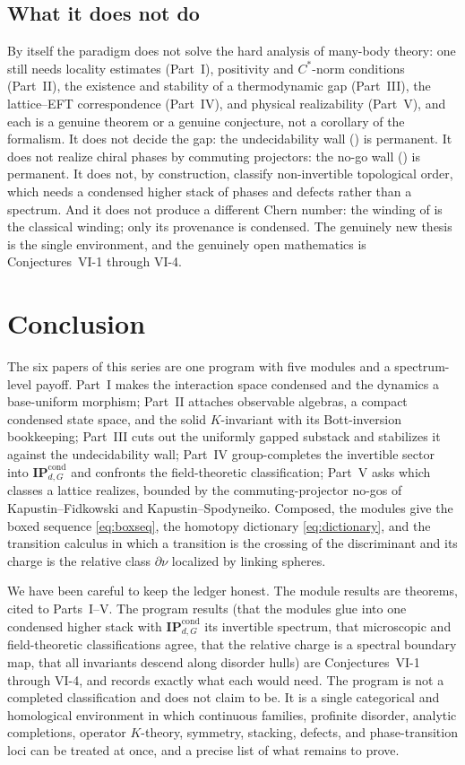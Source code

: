 \documentclass[12pt]{article}
\newcommand{\IPcond}{\mathbf{IP}^{\mathrm{cond}}}  %
\newcommand{\rc}{\partial\nu}                   %
\theoremstyle{plain}
\theoremstyle{definition}
\theoremstyle{remark}
\begin{document}
\subsection{What it does not do}

By itself the paradigm does not solve the hard analysis of many-body theory: one still
needs locality estimates (Part~I), positivity and $C^\ast$-norm conditions (Part~II), the
existence and stability of a thermodynamic gap (Part~III), the lattice--EFT correspondence
(Part~IV), and physical realizability (Part~V), and each is a genuine theorem or a genuine
conjecture, not a corollary of the formalism. It does not decide the gap: the undecidability
wall () is permanent. It does not realize chiral phases by commuting
projectors: the no-go wall () is permanent. It does not, by construction,
classify non-invertible topological order, which needs a condensed higher stack of phases
and defects rather than a spectrum. And it does not produce a different Chern number: the
winding of  is the classical winding; only its provenance is condensed.
The genuinely new thesis is the single environment, and the genuinely open mathematics is
Conjectures~VI-1 through VI-4.

\section{Conclusion}
\label{sec:conclusion}

The six papers of this series are one program with five modules and a spectrum-level
payoff. Part~I makes the interaction space condensed and the dynamics a base-uniform
morphism; Part~II attaches observable algebras, a compact condensed state space, and the
solid $K$-invariant with its Bott-inversion bookkeeping; Part~III cuts out the uniformly
gapped substack and stabilizes it against the undecidability wall; Part~IV group-completes
the invertible sector into $\IPcond_{d,G}$ and confronts the field-theoretic
classification; Part~V asks which classes a lattice realizes, bounded by the
commuting-projector no-gos of Kapustin--Fidkowski and Kapustin--Spodyneiko. Composed, the
modules give the boxed sequence
\eqref{eq:boxseq}, the homotopy dictionary \eqref{eq:dictionary}, and the transition
calculus in which a transition is the crossing of the discriminant and its charge is the
relative class $\rc$ localized by linking spheres.

We have been careful to keep the ledger honest. The module results are theorems, cited to
Parts~I--V\@. The program results (that the modules glue into one condensed higher stack
with $\IPcond_{d,G}$ its invertible spectrum, that microscopic and field-theoretic
classifications agree, that the relative charge is a spectral boundary map, that all
invariants descend along disorder hulls) are Conjectures~VI-1 through VI-4, and
 records exactly what each would need. The program is not a completed
classification and does not claim to be. It is a single categorical and homological
environment in which continuous families, profinite disorder, analytic completions,
operator $K$-theory, symmetry, stacking, defects, and phase-transition loci can be treated
at once, and a precise list of what remains to prove.
\end{document}
